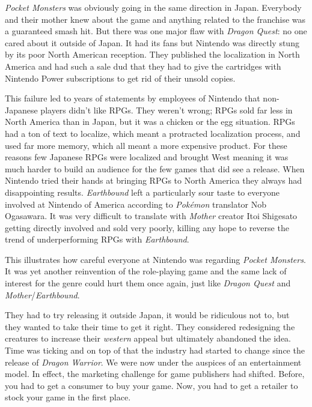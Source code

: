 \documentclass{book}
\begin{document}
\emph{Pocket Monsters} was obviously going in the same direction in Japan. Everybody and their mother knew about the game and anything related to the franchise was a guaranteed smash hit. But there was one major flaw with \emph{Dragon Quest}: no one cared about it outside of Japan. It had its fans but Nintendo was directly stung by its poor North American reception. They published the localization in North America and had such a sale dud that they had to give the cartridges with Nintendo Power subscriptions to get rid of their unsold copies.

This failure led to years of statements by employees of Nintendo that non-Japanese players didn’t like RPGs. They weren’t wrong; RPGs sold far less in North America than in Japan, but it was a chicken or the egg situation. RPGs had a ton of text to localize, which meant a protracted localization process, and used far more memory, which all meant a more expensive product. For these reasons few Japanese RPGs were localized and brought West meaning it was much harder to build an audience for the few games that did see a release. When Nintendo tried their hands at bringing RPGs to North America they always had disappointing results. \emph{Earthbound} left a particularly sour taste to everyone involved at Nintendo of America according to \emph{Pokémon} translator Nob Ogasawara. It was very difficult to translate with \emph{Mother} creator Itoi Shigesato getting directly involved and sold very poorly, killing any hope to reverse the trend of underperforming RPGs with \emph{Earthbound}.

This illustrates how careful everyone at Nintendo was regarding \emph{Pocket Monsters}. It was yet another reinvention of the role-playing game and the same lack of interest for the genre could hurt them once again, just like \emph{Dragon Quest} and \emph{Mother}/\emph{Earthbound}.

They had to try releasing it outside Japan, it would be ridiculous not to, but they wanted to take their time to get it right. They considered redesigning the creatures to increase their \emph{western} appeal but ultimately abandoned the idea. Time was ticking and on top of that the industry had started to change since the release of \emph{Dragon Warrior}. We were now under the auspices of an entertainment model. In effect, the marketing challenge for game publishers had shifted. Before, you had to get a consumer to buy your game. Now, you had to get a retailer to stock your game in the first place.
\end{document}
